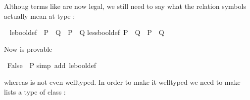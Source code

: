 \begin{isabellebody}
\begin{isamarkuptext}
Althoug terms like  are now legal, we still need to say
what the relation symbols actually mean at type :%
\end{isamarkuptext}%
\ {\isacharparenleft}\isanewline
le{\isacharunderscore}bool{\isacharunderscore}def{\isacharcolon}\ \ {\isachardoublequote}P\ {\isacharless}{\isacharless}{\isacharequal}\ Q\ {\isasymequiv}\ P\ {\isasymlongrightarrow}\ Q{\isachardoublequote}\isanewline
less{\isacharunderscore}bool{\isacharunderscore}def{\isacharcolon}\ {\isachardoublequote}P\ {\isacharless}{\isacharless}\ Q\ {\isasymequiv}\ {\isasymnot}P\ {\isasymand}\ Q{\isachardoublequote}%
\begin{isamarkuptext}%
\noindent
Now  is provable%
\end{isamarkuptext}%
\ {\isachardoublequote}False\ {\isacharless}{\isacharless}{\isacharequal}\ P{\isachardoublequote}\isanewline
{}simp\ add{\isacharcolon}\ le{\isacharunderscore}bool{\isacharunderscore}def{\isacharparenright}%
\begin{isamarkuptext}%
\noindent
whereas \isa{{\isacharbrackleft}{\isacharbrackright}\ {\isacharless}{\isacharless}{\isacharequal}\ {\isacharbrackleft}{\isacharbrackright}} is not even welltyped. In order to make it welltyped
we need to make lists a type of class :%
\end{isamarkuptext}%
\end{isabellebody}%
